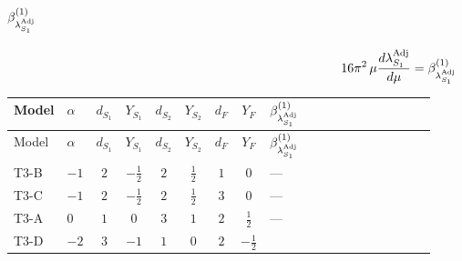 \documentclass{article}
\begin{document}
\begin{landscape}
\section*{$\beta_{\lambda_{S_1}^{\rm Adj}}^{(1)}$}
\[16\pi^2\,\mu\frac{d \lambda_{S_1}^{\rm Adj}}{d\mu}=\beta_{\lambda_{S_1}^{\rm Adj}}^{(1)}\]
\tiny
\begin{longtable}{@{}llcccccc >{\raggedright\arraybackslash}p{0.54\linewidth}@{}}
\toprule
Model & $\alpha$ & $d_{S_1}$ & $Y_{S_1}$ & $d_{S_2}$ & $Y_{S_2}$ & $d_F$ & $Y_F$ & $\beta_{\lambda_{S_1}^{\rm Adj}}^{(1)}$ \\
\midrule
\endfirsthead
\toprule
Model & $\alpha$ & $d_{S_1}$ & $Y_{S_1}$ & $d_{S_2}$ & $Y_{S_2}$ & $d_F$ & $Y_F$ & $\beta_{\lambda_{S_1}^{\rm Adj}}^{(1)}$ \\
\midrule
\endhead
T3-B & $-1$ & $2$ & $-\frac{1}{2}$ & $2$ & $\frac{1}{2}$ & $1$ & $0$ & --- \\
\midrule
T3-C & $-1$ & $2$ & $-\frac{1}{2}$ & $2$ & $\frac{1}{2}$ & $3$ & $0$ & --- \\
\midrule
T3-A & $0$ & $1$ & $0$ & $3$ & $1$ & $2$ & $\frac{1}{2}$ & --- \\
\midrule
T3-D & $-2$ & $3$ & $-1$ & $1$ & $0$ & $2$ & $-\frac{1}{2}$ & \scriptsize\adjustbox{max width=\linewidth}{$\begin{gathered} {\lambda_{S_1}} \left(\frac{1}{2} \operatorname{Tr}\!\left({y_1}\,\left({y_1}\right)^{\dagger}\right)+13 {\lambda_{S_1}^{\rm Adj}}\right) \\ +4 {\lambda_{S_1}^{\rm Adj}} \operatorname{Tr}\!\left({y_1}\,\left({y_1}\right)^{\dagger}\right) \\ -\operatorname{Tr}\!\left({y_1}\,\left({y_1}\right)^{\dagger}\,{y_1}\,\left({y_1}\right)^{\dagger}\right) \\ +\frac{3 {g_2}^4}{4} \\ +{g_Y}^2 \left(9 {g_2}^2-\frac{3 {\lambda_{S_1}}}{2}-12 {\lambda_{S_1}^{\rm Adj}}\right) \\ +{g_2}^2 (-3 {\lambda_{S_1}}-24 {\lambda_{S_1}^{\rm Adj}}) \\ +\frac{3 {g_Y}^4}{2} \\ +\frac{{\lambda_{12}}^2}{4} \\ +\frac{{\lambda_{H1}}^2}{2} \\ +3 {\lambda_{H1}^{\rm Adj}}^2 \\ +\frac{7 {\lambda_{S_1}}^2}{4} \\ +22 {\lambda_{S_1}^{\rm Adj}}^2\end{gathered}$} \\

\end{longtable}
\end{landscape}
\end{document}
